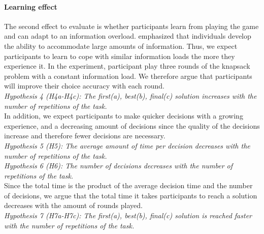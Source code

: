 \paragraph{Learning effect}
The second effect to evaluate is whether participants learn from playing the game and can adapt to an information overload. \cite{Jacoby1974} emphasized that individuals develop the ability to accommodate large amounts of information. Thus, we expect participants to learn to cope with similar information loads the more they experience it. In the experiment, participant play three rounds of the knapsack problem with a constant information load. We therefore argue that participants will improve their choice accuracy with each round.\\
\textit{Hypothesis 4 (H4a-H4c): The first(a), best(b), final(c) solution increases with the number of repetitions of the task. }\\
In addition, we expect participants to make quicker decisions with a growing experience, and a decreasing amount of decisions since the quality of the decisions increase and therefore fewer decisions are necessary. \\
\textit{Hypothesis 5 (H5): The average amount of time per decision decreases with the number of repetitions of the task. }\\
\textit{Hypothesis 6 (H6): The number of decisions decreases with the number of repetitions of the task. }\\
Since the total time is the product of the average decision time and the number of decisions, we argue that the total time it takes participants to reach a solution decreases with the amount of rounds played.\\
\textit{Hypothesis 7 (H7a-H7c): The first(a), best(b), final(c) solution is reached faster with the number of repetitions of the task. }

